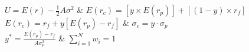 $U = E(r) - \frac{1}{2}A\sigma^{2}$ &  $E(r_{c}) = \left[ y \times E(r_{p})\right] + \left[(1-y)\times r_{f}\right]$ \\


$E(r_{c}) = r_{f} + y\left[E(r_{p})-r_{f}\right]$ &  $\sigma_{c} = y\cdot \sigma_{p}$ \\


$y^{*} = \frac{E(r_{p}) - r_{f}}{A\sigma^{2}_{p}}$ &  $\sum_{i=1}^{N} w_{i} = 1$ \\

